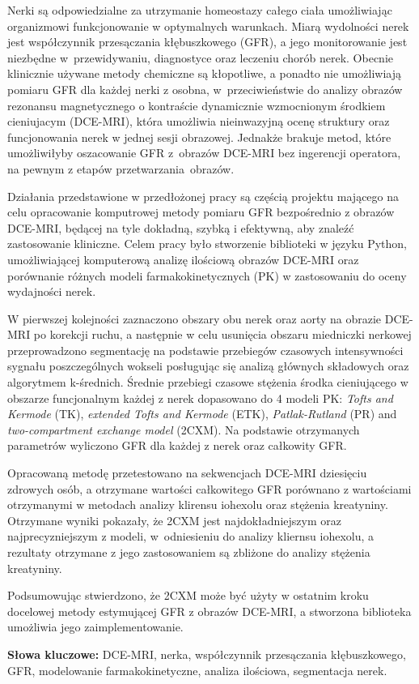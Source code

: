 	
	\begin{spacing}{1.0}
	\begin{small}

Nerki są odpowiedzialne za utrzymanie homeostazy całego ciała umożliwiając organizmowi funkcjonowanie w optymalnych warunkach. Miarą wydolności nerek jest współczynnik przesączania kłębuszkowego (GFR), a jego monitorowanie jest niezbędne w~przewidywaniu, diagnostyce oraz leczeniu chorób nerek. Obecnie klinicznie używane metody chemiczne są kłopotliwe, a ponadto nie umożliwiają pomiaru GFR dla każdej nerki z osobna, w~przeciwieństwie do analizy obrazów rezonansu magnetycznego o kontraście dynamicznie wzmocnionym środkiem cieniujacym (DCE-MRI), która umożliwia nieinwazyjną ocenę struktury oraz funcjonowania  nerek w jednej sesji obrazowej. Jednakże brakuje metod, które umożliwiłyby oszacowanie GFR z~obrazów DCE-MRI bez ingerencji operatora, na pewnym z etapów przetwarzania~obrazów.

Działania przedstawione w przedłożonej pracy są częścią projektu mającego na celu opracowanie komputrowej metody pomiaru GFR bezpośrednio z obrazów DCE-MRI, będącej na tyle dokładną, szybką i efektywną, aby znaleźć zastosowanie kliniczne. Celem pracy było stworzenie biblioteki w języku Python, umożliwiającej komputerową analizę ilościową obrazów DCE-MRI oraz porównanie różnych modeli farmakokinetycznych (PK) w zastosowaniu do oceny wydajności nerek.

W pierwszej kolejności zaznaczono obszary obu nerek oraz aorty na obrazie DCE-MRI po korekcji ruchu, a następnie w celu usunięcia obszaru miedniczki nerkowej przeprowadzono segmentację na podstawie przebiegów czasowych intensywności sygnału poszczególnych wokseli posługując się analizą głównych składowych oraz algorytmem k-średnich. Średnie przebiegi czasowe stężenia środka cieniującego w obszarze funcjonalnym każdej z nerek dopasowano do 4 modeli PK: \textit{Tofts and Kermode} (TK), \textit{extended Tofts and Kermode} (ETK), \textit{Patlak-Rutland} (PR) and \textit{two-compartment exchange model} (2CXM). Na podstawie otrzymanych parametrów wyliczono GFR dla każdej z nerek oraz całkowity GFR.

Opracowaną metodę przetestowano na sekwencjach DCE-MRI dziesięciu zdro\-wych osób, a otrzymane wartości całkowitego GFR porównano z wartościami otrzymanymi w metodach analizy klirensu iohexolu oraz stężenia kreatyniny. 
Otrzymane wyniki pokazały, że 2CXM jest najdokładniejszym oraz najprecyzniejszym z modeli, w~odniesieniu do analizy kliernsu iohexolu, a rezultaty otrzymane z jego zastosowaniem są zbliżone do analizy stężenia kreatyniny.

Podsumowując stwierdzono, że 2CXM może być użyty w ostatnim kroku docelowej metody estymującej GFR z obrazów DCE-MRI, a stworzona biblioteka umożliwia jego zaimplementowanie. 
 

	\end{small}
	
	\vfill
		\normalsize \noindent \textbf{Słowa kluczowe:} DCE-MRI, nerka, współczynnik przesączania kłębuszkowego, GFR, modelowanie farmakokinetyczne, analiza ilościowa, segmentacja nerek.  
		
			\end{spacing}
		\newpage
		\restoregeometry
\thispagestyle{empty}
\mbox{}

	\newpage	
